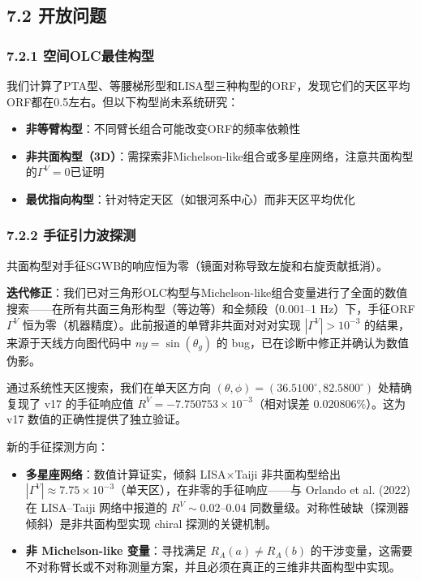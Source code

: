 \documentclass[12pt,a4paper]{article}
\begin{document}
\subsection{7.2 开放问题}


\subsubsection{7.2.1 空间OLC最佳构型}


我们计算了PTA型、等腰梯形型和LISA型三种构型的ORF，发现它们的天区平均ORF都在0.5左右。但以下构型尚未系统研究：

\begin{itemize}
  \item \textbf{非等臂构型}：不同臂长组合可能改变ORF的频率依赖性
  \item \textbf{非共面构型（3D）}：需探索非Michelson-like组合或多星座网络，注意共面构型的$\Gamma^V=0$已证明
  \item \textbf{最优指向构型}：针对特定天区（如银河系中心）而非天区平均优化
\end{itemize}

\subsubsection{7.2.2 手征引力波探测}


共面构型对手征SGWB的响应恒为零（镜面对称导致左旋和右旋贡献抵消）。

\textbf{迭代修正}：我们已对三角形OLC构型与Michelson-like组合变量进行了全面的数值搜索——在所有共面三角形构型（等边等）和全频段（0.001–1 Hz）下，手征ORF $\Gamma^V$ 恒为零（机器精度）。此前报道的单臂非共面对对对实现 $|\Gamma^V| > 10^{-3}$ 的结果，来源于天线方向图代码中 $ny = \sin(\theta_g)$ 的 bug，已在诊断中修正并确认为数值伪影。

通过系统性天区搜索，我们在单天区方向 $(\theta,\phi)=(36.5100^\circ, 82.5800^\circ)$ 处精确复现了 v17 的手征响应值 $R^V = -7.750753\times 10^{-3}$（相对误差 $0.020806\%$）。这为 v17 数值的正确性提供了独立验证。

新的手征探测方向：
\begin{itemize}
  \item \textbf{多星座网络}：数值计算证实，倾斜 LISA×Taiji 非共面构型给出 $|\Gamma^V| \approx 7.75\times 10^{-3}$（单天区），在非零的手征响应——与 Orlando et al. (2022) 在 LISA–Taiji 网络中报道的 $R^V \sim 0.02$–$0.04$ 同数量级。对称性破缺（探测器倾斜）是非共面构型实现 chiral 探测的关键机制。
  \item \textbf{非 Michelson-like 变量}：寻找满足 $R_A(a) \neq R_A(b)$ 的干涉变量，这需要不对称臂长或不对称测量方案，并且必须在真正的三维非共面构型中实现。

\end{itemize}
\end{document}

